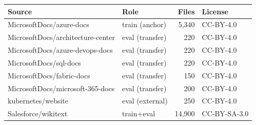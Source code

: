 \begin{tabular}{llrl}
\toprule
\textbf{Source} & \textbf{Role} & \textbf{Files} & \textbf{License} \\
\midrule
MicrosoftDocs/azure-docs & train (anchor) & 5,340 & CC-BY-4.0 \\
MicrosoftDocs/architecture-center & eval (transfer) & 220 & CC-BY-4.0 \\
MicrosoftDocs/azure-devops-docs & eval (transfer) & 220 & CC-BY-4.0 \\
MicrosoftDocs/sql-docs & eval (transfer) & 220 & CC-BY-4.0 \\
MicrosoftDocs/fabric-docs & eval (transfer) & 150 & CC-BY-4.0 \\
MicrosoftDocs/microsoft-365-docs & eval (transfer) & 200 & CC-BY-4.0 \\
kubernetes/website & eval (external) & 250 & CC-BY-4.0 \\
Salesforce/wikitext & train+eval & 14,900 & CC-BY-SA-3.0 \\
\bottomrule
\end{tabular}
